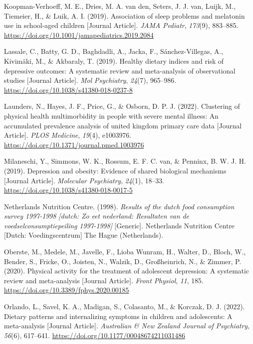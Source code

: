 \documentclass[
  letterpaper,
  DIV=11,
  numbers=noendperiod]{scrreport}
\newlength{\cslhangindent}
\newenvironment{CSLReferences}[2] %
 {\begin{list}{}{%
  \setlength{\itemindent}{0pt}
  \setlength{\leftmargin}{0pt}
  \setlength{\parsep}{0pt}
  \ifodd #1
   \setlength{\leftmargin}{\cslhangindent}
   \setlength{\itemindent}{-1\cslhangindent}
  \fi
  \setlength{\itemsep}{#2\baselineskip}}}
 {\end{list}}
\begin{document}
\begin{CSLReferences}{1}{0}
Koopman-Verhoeff, M. E., Dries, M. A. van den, Seters, J. J. van, Luijk,
M., Tiemeier, H., \& Luik, A. I. (2019). Association of sleep problems
and melatonin use in school-aged children {[}Journal Article{]}.
\emph{JAMA Pediatr}, \emph{173}(9), 883--885.
\url{https://doi.org/10.1001/jamapediatrics.2019.2084}

Lassale, C., Batty, G. D., Baghdadli, A., Jacka, F., Sánchez-Villegas,
A., Kivimäki, M., \& Akbaraly, T. (2019). Healthy dietary indices and
risk of depressive outcomes: A systematic review and meta-analysis of
observational studies {[}Journal Article{]}. \emph{Mol Psychiatry},
\emph{24}(7), 965--986. \url{https://doi.org/10.1038/s41380-018-0237-8}

Launders, N., Hayes, J. F., Price, G., \& Osborn, D. P. J. (2022).
Clustering of physical health multimorbidity in people with severe
mental illness: An accumulated prevalence analysis of united kingdom
primary care data {[}Journal Article{]}. \emph{PLOS Medicine},
\emph{19}(4), e1003976.
\url{https://doi.org/10.1371/journal.pmed.1003976}

Milaneschi, Y., Simmons, W. K., Rossum, E. F. C. van, \& Penninx, B. W.
J. H. (2019). Depression and obesity: Evidence of shared biological
mechanisms {[}Journal Article{]}. \emph{Molecular Psychiatry},
\emph{24}(1), 18--33. \url{https://doi.org/10.1038/s41380-018-0017-5}

Netherlands Nutrition Centre. (1998). \emph{Results of the dutch food
consumption survey 1997-1998 {[}dutch: Zo eet nederland: Resultaten van
de voedselconsumptiepeiling 1997-1998{]}} {[}Generic{]}. Netherlands
Nutrition Centre {[}Dutch: Voedingscentrum{]} The Hague (Netherlands).

Oberste, M., Medele, M., Javelle, F., Lioba Wunram, H., Walter, D.,
Bloch, W., Bender, S., Fricke, O., Joisten, N., Walzik, D.,
Großheinrich, N., \& Zimmer, P. (2020). Physical activity for the
treatment of adolescent depression: A systematic review and
meta-analysis {[}Journal Article{]}. \emph{Front Physiol}, \emph{11},
185. \url{https://doi.org/10.3389/fphys.2020.00185}

Orlando, L., Savel, K. A., Madigan, S., Colasanto, M., \& Korczak, D. J.
(2022). Dietary patterns and internalizing symptoms in children and
adolescents: A meta-analysis {[}Journal Article{]}. \emph{Australian \&
New Zealand Journal of Psychiatry}, \emph{56}(6), 617--641.
\url{https://doi.org/10.1177/00048674211031486}


\end{CSLReferences}
\end{document}
